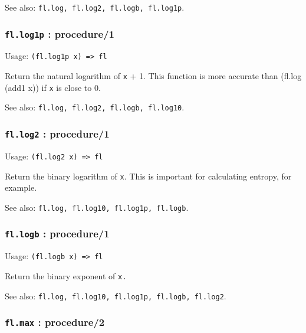 \documentclass[
]{article}
\newcommand{\passthrough}[1]{#1}
\begin{document}
See also: \passthrough{\lstinline!fl.log, fl.log2, fl.logb, fl.log1p!}.

\hypertarget{fl.log1p-procedure1}{%
\subsubsection{\texorpdfstring{\texttt{fl.log1p} :
procedure/1}{fl.log1p : procedure/1}}\label{fl.log1p-procedure1}}

Usage: \passthrough{\lstinline!(fl.log1p x) => fl!}

Return the natural logarithm of \passthrough{\lstinline!x!} + 1. This
function is more accurate than (fl.log (add1 x)) if
\passthrough{\lstinline!x!} is close to 0.

See also: \passthrough{\lstinline!fl.log, fl.log2, fl.logb, fl.log10!}.

\hypertarget{fl.log2-procedure1}{%
\subsubsection{\texorpdfstring{\texttt{fl.log2} :
procedure/1}{fl.log2 : procedure/1}}\label{fl.log2-procedure1}}

Usage: \passthrough{\lstinline!(fl.log2 x) => fl!}

Return the binary logarithm of \passthrough{\lstinline!x!}. This is
important for calculating entropy, for example.

See also: \passthrough{\lstinline!fl.log, fl.log10, fl.log1p, fl.logb!}.

\hypertarget{fl.logb-procedure1}{%
\subsubsection{\texorpdfstring{\texttt{fl.logb} :
procedure/1}{fl.logb : procedure/1}}\label{fl.logb-procedure1}}

Usage: \passthrough{\lstinline!(fl.logb x) => fl!}

Return the binary exponent of \passthrough{\lstinline!x.!}

See also:
\passthrough{\lstinline!fl.log, fl.log10, fl.log1p, fl.logb, fl.log2!}.

\hypertarget{fl.max-procedure2}{%
\subsubsection{\texorpdfstring{\texttt{fl.max} :
procedure/2}{fl.max : procedure/2}}\label{fl.max-procedure2}}
\end{document}

